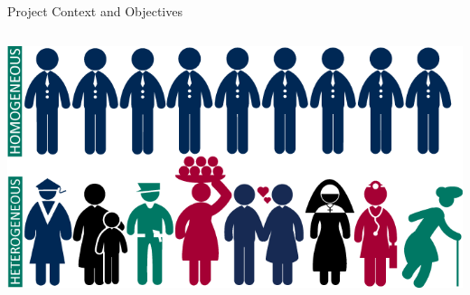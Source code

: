 \begin{slide}{Project Context and Objectives}
\begin{columns}[T]
		\begin{column}{.5\textwidth}
			\vspace{2cm}
			\centering
			\includegraphics[width=.8\textwidth]{images/homogeneous}
		\end{column}
	\end{columns}
\end{slide}